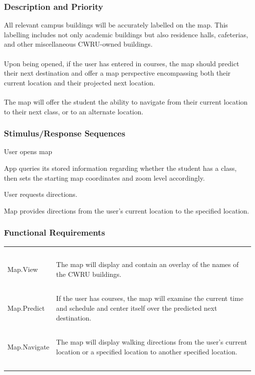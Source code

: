 \documentclass[pdftex,12pt,letter]{article}
\begin{document}
\subsubsection{Description and Priority}
All relevant campus buildings will be accurately labelled on the map. This labelling includes not only academic buildings but also residence halls, cafeterias, and other miscellaneous CWRU-owned buildings.\\\\
Upon being opened, if the user has entered in courses, the map should predict their next destination and offer a map perspective encompassing both their current location and their projected next location.\\\\
The map will offer the student the ability to navigate from their current location to their next class, or to an alternate location.
\subsubsection{Stimulus/Response Sequences}
\begin{description}\itemsep1pt
\item[Stimulus:] User opens map
\item[Response:] App queries its stored information regarding whether the student has a class, then sets the starting map coordinates and zoom level accordingly.
\item[Stimulus:] User requests directions.
\item[Response:] Map provides directions from the user's current location to the specified location.
\end{description}
\subsubsection{Functional Requirements}
\begin{table}[!h]
\begin{tabularx}{\textwidth }[t]{|l Y|}
\hline
~&~\\
Map.View & The map will display and contain an overlay of the names of the CWRU buildings. \\ 
~&~\\
Map.Predict & If the user has courses, the map will examine the current time and schedule and center itself over the predicted next destination. \\
~&~\\
Map.Navigate & The map will display walking directions from the user's current location or a specified location to another specified location. \\
~&~\\
\hline
\end{tabularx}
\end{table}
\end{document}
